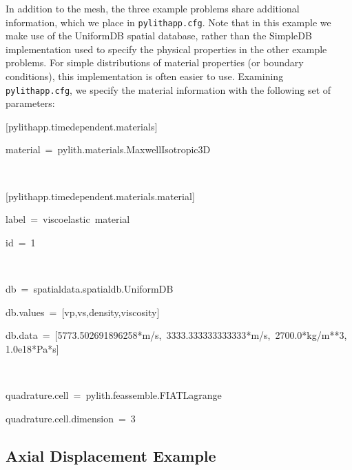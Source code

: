 In addition to the mesh, the three example problems share additional
information, which we place in \texttt{pylithapp.cfg}. Note that in
this example we make use of the UniformDB spatial database, rather
than the SimpleDB implementation used to specify the physical properties
in the other example problems. For simple distributions of material
properties (or boundary conditions), this implementation is often
easier to use. Examining \texttt{pylithapp.cfg}, we specify the material
information with the following set of parameters:
\begin{lyxcode}
{\small{}{[}pylithapp.timedependent.materials{]}}{\small \par}

{\small{}material~=~pylith.materials.MaxwellIsotropic3D}{\small \par}

{\small{}~}{\small \par}

{\small{}{[}pylithapp.timedependent.materials.material{]}}{\small \par}

{\small{}label~=~viscoelastic~material}{\small \par}

{\small{}id~=~1}{\small \par}

{\small{}~}{\small \par}

{\small{}db~=~spatialdata.spatialdb.UniformDB}{\small \par}

{\small{}db.values~=~{[}vp,vs,density,viscosity{]}}{\small \par}

{\small{}db.data~=~{[}5773.502691896258{*}m/s,~3333.333333333333{*}m/s,~2700.0{*}kg/m{*}{*}3,~1.0e18{*}Pa{*}s{]}}{\small \par}

{\small{}~}{\small \par}

{\small{}quadrature.cell~=~pylith.feassemble.FIATLagrange}{\small \par}

{\small{}quadrature.cell.dimension~=~3}{\small \par}
\end{lyxcode}

\subsection{Axial Displacement Example}

